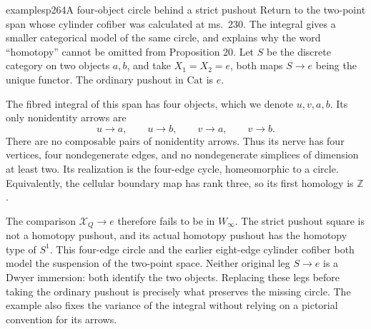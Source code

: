\begin{dcomment}{examples}{p264}{A four-object circle behind a strict pushout}
Return to the two-point span whose cylinder cofiber was calculated at ms.~230. The integral gives a smaller categorical model of the same circle, and explains why the word ``homotopy'' cannot be omitted from Proposition 20. Let $S$ be the discrete category on two objects $a,b$, and take $X_1=X_2=e$, both maps $S\to e$ being the unique functor. The ordinary pushout in $\mathrm{Cat}$ is $e$.

The fibred integral of this span has four objects, which we denote $u,v,a,b$. Its only nonidentity arrows are
\[
 u\longrightarrow a,\qquad u\longrightarrow b,
 \qquad v\longrightarrow a,\qquad v\longrightarrow b.
\]
There are no composable pairs of nonidentity arrows. Thus its nerve has four vertices, four nondegenerate edges, and no nondegenerate simplices of dimension at least two. Its realization is the four-edge cycle, homeomorphic to a circle. Equivalently, the cellular boundary map has rank three, so its first homology is $\mathbb Z$.

The comparison $\mathcal X_Q\to e$ therefore fails to be in $W_\infty$. The strict pushout square is not a homotopy pushout, and its actual homotopy pushout has the homotopy type of $S^1$. This four-edge circle and the earlier eight-edge cylinder cofiber both model the suspension of the two-point space. Neither original leg $S\to e$ is a Dwyer immersion: both identify the two objects. Replacing these legs before taking the ordinary pushout is precisely what preserves the missing circle. The example also fixes the variance of the integral without relying on a pictorial convention for its arrows.
\end{dcomment}


